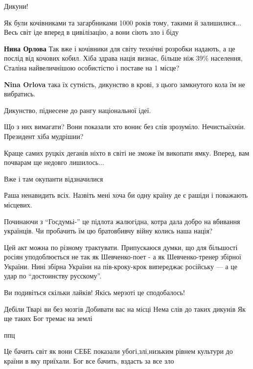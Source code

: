 \begin{itemize}
Дикуни!

Як були кочівниками та загарбниками 1000 років тому, такими й залишилися... Весь світ іде вперед в цивілізацію, а вони сіють зло і біду


\textbf{Нина Орлова} Так вже і кочівники для світу технічні розробки надають, а
це послід від кочових кобил. Хіба здрава нація визнає, більше ніж 39\%
населення, Сталіна найвеличнішою особистістю і поставе на 1 місце?


\textbf{Nina Orlova} така їх сутність, дикунство в крові, з цього замкнутого кола їм не вибратись.

Дикунство, піднесене до рангу національної ідеї.

Що з них вимагати? Вони показали хто вониє без слів зрозуміло. Нечистьаїхніи. Президент хіба мудрішии?


Краще самих руцкіх деганів ніхто в світі не зможе їм викопати ямку. Вперед, вам
почварам ще недовго лишилось...

Вже і там окупанти відзначилися

Раша ненавидить всіх. Назвіть мені хоча би одну країну де є рашіди і поважають місцевих.


Починаючи з \enquote{Госдумьі-} це підлота жалюгідна, котра дала добро на вбивання
українців.  Чи пробачить їм цю братовбивчу війну колись наша нація?


Цей акт можна по різному трактувати. Припускаюся думки, що для більшості росіян
уподоблюється не так як Шевченко-поет - а як Шевченко-тренер збірної України.
Нині збірна України на пів-кроку-крок випереджає російську --- а це удар по
\enquote{достоинству русскому}.

Ви подивіться скільки лайків! Якісь мерзоті це сподобалось!

Дебіли Тварі ви без мозгів Добивати вас на місці Нема слів до таких дикунів Як ще таких Бог тремає на землі

ппц


Це бачить світ як вони СЕБЕ показали убогі,злі,низьким рівнем культури до країни в яку приїхали.
Бог все бачить, вздасть за все зло


\end{itemize}
